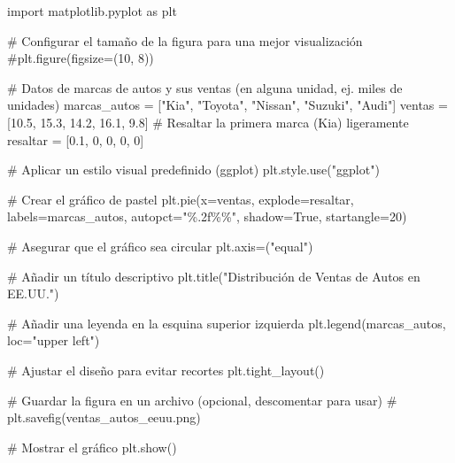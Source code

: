 \documentclass[
  jou,
  floatsintext,
  longtable,
  a4paper,
  nolmodern,
  notxfonts,
  notimes,
  12pt,
  colorlinks=true,linkcolor=blue,citecolor=blue,urlcolor=blue]{apa7}
\newenvironment{Shaded}{\begin{snugshade}}{\end{snugshade}}
\newcommand{\CommentTok}[1]{\textcolor[rgb]{0.37,0.37,0.37}{#1}}
\newcommand{\DecValTok}[1]{\textcolor[rgb]{0.68,0.00,0.00}{#1}}
\newcommand{\FloatTok}[1]{\textcolor[rgb]{0.68,0.00,0.00}{#1}}
\newcommand{\ImportTok}[1]{\textcolor[rgb]{0.00,0.46,0.62}{#1}}
\newcommand{\NormalTok}[1]{\textcolor[rgb]{0.00,0.23,0.31}{#1}}
\newcommand{\OperatorTok}[1]{\textcolor[rgb]{0.37,0.37,0.37}{#1}}
\newcommand{\SpecialCharTok}[1]{\textcolor[rgb]{0.37,0.37,0.37}{#1}}
\newcommand{\StringTok}[1]{\textcolor[rgb]{0.13,0.47,0.30}{#1}}
\newcommand{\VariableTok}[1]{\textcolor[rgb]{0.07,0.07,0.07}{#1}}
\begin{document}
\begin{Shaded}
\begin{Highlighting}[]
\ImportTok{import}\NormalTok{ matplotlib.pyplot }\ImportTok{as}\NormalTok{ plt}

\CommentTok{\# Configurar el tamaño de la figura para una mejor visualización}
\CommentTok{\#plt.figure(figsize=(10, 8))}

\CommentTok{\# Datos de marcas de autos y sus ventas (en alguna unidad, ej. miles de unidades)}
\NormalTok{marcas\_autos }\OperatorTok{=}\NormalTok{ [}\StringTok{"Kia"}\NormalTok{, }\StringTok{"Toyota"}\NormalTok{, }\StringTok{"Nissan"}\NormalTok{, }\StringTok{"Suzuki"}\NormalTok{, }\StringTok{"Audi"}\NormalTok{]}
\NormalTok{ventas }\OperatorTok{=}\NormalTok{ [}\FloatTok{10.5}\NormalTok{, }\FloatTok{15.3}\NormalTok{, }\FloatTok{14.2}\NormalTok{, }\FloatTok{16.1}\NormalTok{, }\FloatTok{9.8}\NormalTok{]}
\CommentTok{\# Resaltar la primera marca (Kia) ligeramente}
\NormalTok{resaltar }\OperatorTok{=}\NormalTok{ [}\FloatTok{0.1}\NormalTok{, }\DecValTok{0}\NormalTok{, }\DecValTok{0}\NormalTok{, }\DecValTok{0}\NormalTok{, }\DecValTok{0}\NormalTok{]}

\CommentTok{\# Aplicar un estilo visual predefinido (ggplot)}
\NormalTok{plt.style.use(}\StringTok{"ggplot"}\NormalTok{)}

\CommentTok{\# Crear el gráfico de pastel}
\NormalTok{plt.pie(x}\OperatorTok{=}\NormalTok{ventas, explode}\OperatorTok{=}\NormalTok{resaltar, labels}\OperatorTok{=}\NormalTok{marcas\_autos, autopct}\OperatorTok{=}\StringTok{"}\SpecialCharTok{\%.2f\%\%}\StringTok{"}\NormalTok{, shadow}\OperatorTok{=}\VariableTok{True}\NormalTok{, startangle}\OperatorTok{=}\DecValTok{20}\NormalTok{)}

\CommentTok{\# Asegurar que el gráfico sea circular}
\NormalTok{plt.axis}\OperatorTok{=}\NormalTok{(}\StringTok{"equal"}\NormalTok{)}

\CommentTok{\# Añadir un título descriptivo}
\NormalTok{plt.title(}\StringTok{"Distribución de Ventas de Autos en EE.UU."}\NormalTok{)}

\CommentTok{\# Añadir una leyenda en la esquina superior izquierda}
\NormalTok{plt.legend(marcas\_autos, loc}\OperatorTok{=}\StringTok{"upper left"}\NormalTok{)}

\CommentTok{\# Ajustar el diseño para evitar recortes}
\NormalTok{plt.tight\_layout()}

\CommentTok{\# Guardar la figura en un archivo (opcional, descomentar para usar)}
\CommentTok{\# plt.savefig(\textquotesingle{}ventas\_autos\_eeuu.png\textquotesingle{})}

\CommentTok{\# Mostrar el gráfico}
\NormalTok{plt.show()}
\end{Highlighting}
\end{Shaded}
\end{document}
